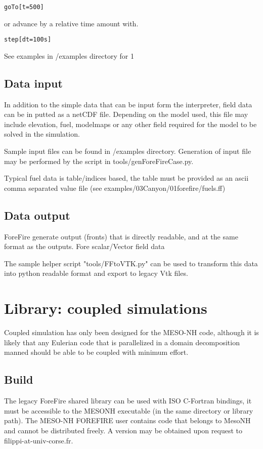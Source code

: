 \begin{verbatim}
goTo[t=500]
\end{verbatim}

or advance by a relative time amount with.

\begin{verbatim}
step[dt=100s]
\end{verbatim}

See examples in /examples directory for 1

\section{Data input}

In addition to the simple data that can be input form the interpreter, field data can be in putted as a netCDF file.
Depending on the model used, this file may include elevation, fuel, modelmaps or any other field required for the model to be solved in the simulation.

Sample input files can be found in /examples directory.
Generation of input file may be performed by the script in tools/genForeFireCase.py.

Typical fuel data is table/indices based, the table must be provided as an ascii comma separated value file (see examples/03Canyon/01forefire/fuels.ff)


\section{Data output}
ForeFire generate output (fronts) that is directly readable, and at the same format as the outputs.
Fore scalar/Vector field data

The sample helper script "tools/FFtoVTK.py" can be used to transform this data into python readable format and export to legacy Vtk files.


\chapter{Library: coupled simulations}

Coupled simulation has only been designed for the MESO-NH code, although it is likely that any Eulerian code that is parallelized in a domain decomposition manned should be able to be coupled with minimum effort.

\section{Build}
The legacy ForeFire shared library can be used with ISO C-Fortran bindings, it must be accessible to the MESONH executable (in the same directory or library path). The MESO-NH FOREFIRE user contains code that belongs to MesoNH and cannot be distributed freely. A version may be obtained upon request to filippi-at-univ-corse.fr.

